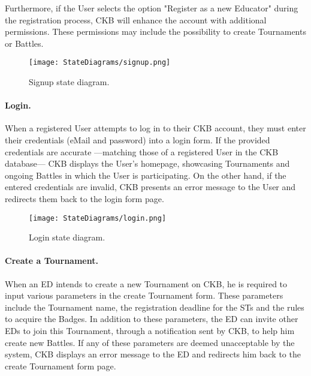 Furthermore, if the User selects the option "Register as a new Educator" during the registration process, CKB will enhance the account with additional permissions. These permissions may include the possibility to create Tournaments or Battles.

\begin{figure}[H]
    \begin{center}
        \texttt{[image: StateDiagrams/signup.png]}
        \caption{Signup state diagram.}
        \label{fig:signup_sd}%
    \end{center}
\end{figure}

\paragraph{Login.}
When a registered User attempts to log in to their CKB account, they must enter their credentials (eMail and password) into a login form. If the provided credentials are accurate —matching those of a registered User in the CKB database— CKB displays the User's homepage, showcasing Tournaments and ongoing Battles in which the User is participating. On the other hand, if the entered credentials are invalid, CKB presents an error message to the User and redirects them back to the login form page.

\begin{figure}[H]
    \begin{center}
        \texttt{[image: StateDiagrams/login.png]}
        \caption{Login state diagram.}
        \label{fig:login_sd}%
    \end{center}
\end{figure}

\newpage

\paragraph{Create a Tournament.}
When an ED intends to create a new Tournament on CKB, he is required to input various parameters in the create Tournament form. These parameters include the Tournament name, the registration deadline for the STs and the rules to acquire the Badges. In addition to these parameters, the ED can invite other EDs to join this Tournament, through a notification sent by CKB, to help him create new Battles. If any of these parameters are deemed unacceptable by the system, CKB displays an error message to the ED and redirects him back to the create Tournament form page.

